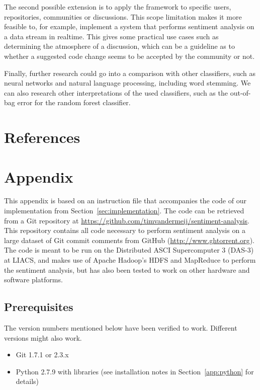 \documentclass{article}
\begin{document}
The second possible extension is to apply the framework to specific users,
repositories, communities or discussions. This scope limitation makes it
more feasible to, for example, implement a system that performs sentiment
analysis on a data stream in realtime. This gives some practical use cases such 
as determining the atmosphere of a discussion, which can be a guideline as to 
whether a suggested code change seems to be accepted by the community or not.

Finally, further research could go into a comparison with other classifiers,
such as neural networks and natural language processing, including word 
stemming. We can also research other interpretations of the used classifiers, 
such as the out-of-bag error for the random forest classifier.

\section*{References}\label{sec:references}
\printbibliography[heading=none]

\newpage

\appendix
\section{Appendix}\label{app:appendix}
This appendix is based on an instruction file that accompanies the 
code of our implementation from Section~\ref{sec:implementation}. The code can 
be retrieved from a Git repository at 
\url{https://github.com/timvandermeij/sentiment-analysis}. This repository 
contains all code necessary to perform sentiment analysis on a large dataset of 
Git commit comments from GitHub (\url{http://www.ghtorrent.org}). The code is 
meant to be run on the Distributed ASCI Supercomputer 3 (DAS-3) at LIACS, and 
makes use of Apache Hadoop's HDFS and MapReduce to perform the sentiment 
analysis, but has also been tested to work on other hardware and software 
platforms.

\subsection{Prerequisites}\label{app:prerequisities}
The version numbers mentioned below have been verified to work. Different
versions might also work.

\begin{itemize}
  \item Git 1.7.1 or 2.3.x
  \item Python 2.7.9 with libraries (see installation notes in 
    Section~\ref{app:python} for details)
\end{itemize}
\end{document}
